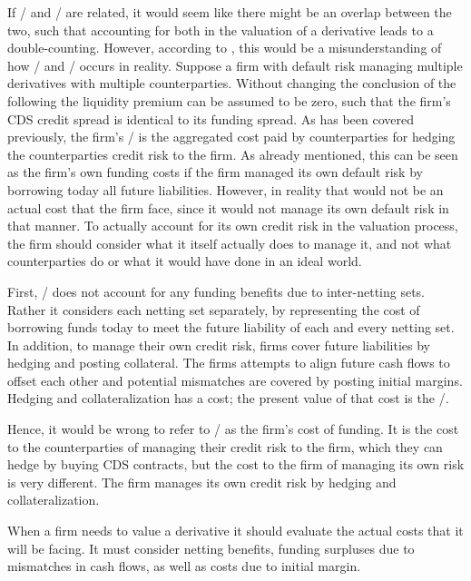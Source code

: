 \documentclass[main.tex]{subfiles}
\begin{document}
    If \DVA/ and \FVA/ are related, it would seem like there might be an overlap between the two,
    such that accounting for both in the valuation of a derivative leads to a double-counting.
    However, according to \textcite{Ruiz2015XVA}, 
    this would be a misunderstanding of how \DVA/ and \FVA/ occurs in reality.
    Suppose a firm with default risk managing multiple derivatives with multiple counterparties.
    Without changing the conclusion of the following the liquidity premium can be assumed to be zero, 
    such that the firm's CDS credit spread is identical to its funding spread.
    As has been covered previously, the firm's \DVA/ is the aggregated cost
    paid by counterparties for hedging the counterparties credit risk to the firm.
    As already mentioned, this can be seen as the firm's own funding costs
    if the firm managed its own default risk by borrowing today all future liabilities.
    However, in reality that would not be an actual cost that the firm face,
    since it would not manage its own default risk in that manner.
    To actually account for its own credit risk in the valuation process,
    the firm should consider what it itself actually does to manage it,
    and not what counterparties do or what it would have done in an ideal world.

    First, \DVA/ does not account for any funding benefits due to inter-netting sets.
    Rather it considers each netting set separately, by representing the cost 
    of borrowing funds today to meet the future liability of each and every netting set.
    In addition, to manage their own credit risk, firms cover future liabilities
    by hedging and posting collateral.
    The firms attempts to align future cash flows to offset each other
    and potential mismatches are covered by posting initial margins. 
    Hedging and collateralization has a cost; 
    the present value of that cost is the \FVA/.

    Hence, it would be wrong to refer to \DVA/ as the firm's cost of funding.
    It is the cost to the counterparties of managing their credit risk to the firm,
    which they can hedge by buying CDS contracts,
    but the cost to the firm of managing its own risk is very different. 
    The firm manages its own credit risk by hedging and collateralization.

    When a firm needs to value a derivative it should evaluate the actual costs that it will be facing.
    It must consider netting benefits, funding surpluses due to mismatches in cash flows,
    as well as costs due to initial margin.
\end{document}
